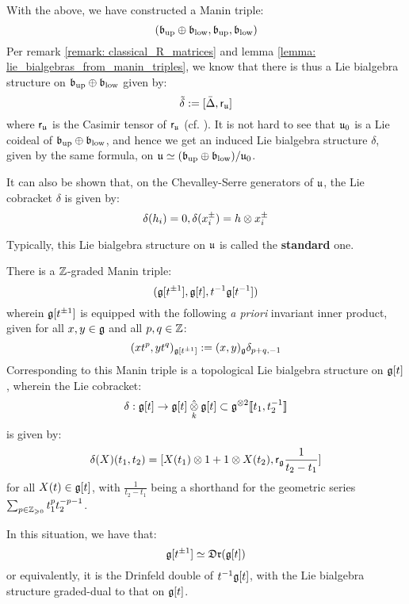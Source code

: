 \begin{example}
            With the above, we have constructed a Manin triple:
                $$(\mathfrak{b}_{\mathrm{up}} \oplus \mathfrak{b}_{\mathrm{low}}, \mathfrak{b}_{\mathrm{up}}, \mathfrak{b}_{\mathrm{low}})$$
            Per remark \ref{remark: classical_R_matrices} and lemma \ref{lemma: lie_bialgebras_from_manin_triples}, we know that there is thus a Lie bialgebra structure on $\mathfrak{b}_{\mathrm{up}} \oplus \mathfrak{b}_{\mathrm{low}}$ given by:
                $$\tilde{\delta} := [\bar{\Delta}, \mathsf{r}_{\mathfrak{u}}]$$
            where $\mathsf{r}_{\mathfrak{u}}$ is the Casimir tensor of $\mathsf{r}_{\mathfrak{u}}$ (cf. \cite[Section 2.5]{kac_infinite_dimensional_lie_algebras}). It is not hard to see that $\mathfrak{u}_0$ is a Lie coideal of $\mathfrak{b}_{\mathrm{up}} \oplus \mathfrak{b}_{\mathrm{low}}$, and hence we get an induced Lie bialgebra structure $\delta$, given by the same formula, on $\mathfrak{u} \simeq (\mathfrak{b}_{\mathrm{up}} \oplus \mathfrak{b}_{\mathrm{low}})/\mathfrak{u}_0$.
            
            It can also be shown that, on the Chevalley-Serre generators of $\mathfrak{u}$, the Lie cobracket $\delta$ is given by:
                $$\delta(h_i) = 0, \delta(x_i^{\pm}) = h \tensor x_i^{\pm}$$

            Typically, this Lie bialgebra structure on $\mathfrak{u}$ is called the \textbf{standard} one.
        \end{example}
        \begin{example} \label{example: finite_type_yangian_manin_triple}
            There is a $\mathbb{Z}$-graded Manin triple:
                $$( \mathfrak{g}[t^{\pm 1}], \mathfrak{g}[t], t^{-1}\mathfrak{g}[t^{-1}] )$$
            wherein $\mathfrak{g}[t^{\pm 1}]$ is equipped with the following \textit{a priori} invariant inner product, given for all $x, y \in \mathfrak{g}$ and all $p, q \in \mathbb{Z}$:
                $$(x t^p, y t^q)_{\mathfrak{g}[t^{\pm 1}]} := (x, y)_{\mathfrak{g}} \delta_{p + q, -1}$$
            Corresponding to this Manin triple is a topological Lie bialgebra structure on $\mathfrak{g}[t]$, wherein the Lie cobracket:
                $$\delta: \g[t] \to \g[t] \hattensor_k \g[t] \subset \g^{\tensor 2}[\![t_1, t_2^{-1}]\!]$$
            is given by:
                $$\delta(X)(t_1, t_2) = [ X(t_1) \tensor 1 + 1 \tensor X(t_2), \sfr_{\g} \frac{1}{t_2 - t_1} ]$$
            for all $X(t) \in \mathfrak{g}[t]$, with $\frac{1}{t_2 - t_1}$ being a shorthand for the geometric series $\sum_{p \in \mathbb{Z}_{\geqslant 0}} t_1^p t_2^{-p - 1}$.

            In this situation, we have that:
                $$\mathfrak{g}[t^{\pm 1}] \simeq \mathfrak{Dr}(\mathfrak{g}[t])$$
            or equivalently, it is the Drinfeld double of $t^{-1}\mathfrak{g}[t]$, with the Lie bialgebra structure graded-dual to that on $\mathfrak{g}[t]$. 
        \end{example}

